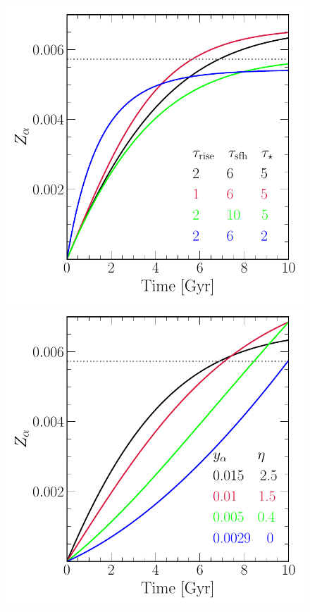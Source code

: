 \documentclass[12pt]{article}
\begin{document}
\begin{figure}
\centering
\includegraphics[scale = 0.52]{vartimescales.pdf}
\includegraphics[scale = 0.52]{varyieldeta.pdf}
\caption{
}
\end{figure}
\end{document}
